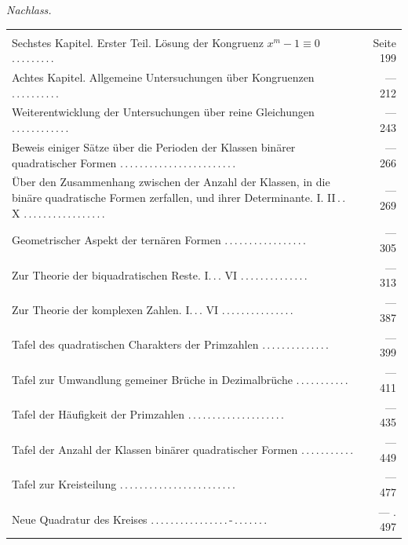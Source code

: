 \par\medskip{}\textit{Nachlass.}
\begingroup\fontsize{10}{13}\selectfont
\begin{longtable}{@{}>{\raggedright\arraybackslash}p{.86\linewidth}@{\quad}r@{}}
\multicolumn{2}{@{}l}{Untersuchung der Reste:}\\[3pt]
Sechstes Kapitel. Erster Teil. Lösung der Kongruenz $x^m-1\equiv0$ .\,.\,.\,.\,.\,.\,.\,.\,. & Seite 199 \\[3pt]
Achtes Kapitel. Allgemeine Untersuchungen über Kongruenzen .\,.\,.\,.\,.\,.\,.\,.\,.\,. & — 212 \\[3pt]
Weiterentwicklung der Untersuchungen über reine Gleichungen .\,.\,.\,.\,.\,.\,.\,.\,.\,.\,.\,. & — 243 \\[3pt]
Beweis einiger Sätze über die Perioden der Klassen binärer quadratischer Formen .\,.\,.\,.\,.\,.\,.\,.\,.\,.\,.\,.\,.\,.\,.\,.\,.\,.\,.\,.\,.\,.\,.\,. & — 266 \\[3pt]
Über den Zusammenhang zwischen der Anzahl der Klassen, in die binäre quadratische Formen zerfallen, und ihrer Determinante. I. II\,.\,. X .\,.\,.\,.\,.\,.\,.\,.\,.\,.\,.\,.\,.\,.\,.\,.\,. & — 269 \\[3pt]
Geometrischer Aspekt der ternären Formen .\,.\,.\,.\,.\,.\,.\,.\,.\,.\,.\,.\,.\,.\,.\,.\,. & — 305 \\[3pt]
Zur Theorie der biquadratischen Reste. I.\,.\,. VI .\,.\,.\,.\,.\,.\,.\,.\,.\,.\,.\,.\,.\,. & — 313 \\[3pt]
Zur Theorie der komplexen Zahlen. I.\,.\,. VI .\,.\,.\,.\,.\,.\,.\,.\,.\,.\,.\,.\,.\,.\,. & — 387 \\[3pt]
Tafel des quadratischen Charakters der Primzahlen .\,.\,.\,.\,.\,.\,.\,.\,.\,.\,.\,.\,.\,. & — 399 \\[3pt]
Tafel zur Umwandlung gemeiner Brüche in Dezimalbrüche .\,.\,.\,.\,.\,.\,.\,.\,.\,.\,. & — 411 \\[3pt]
Tafel der Häufigkeit der Primzahlen .\,.\,.\,.\,.\,.\,.\,.\,.\,.\,.\,.\,.\,.\,.\,.\,.\,.\,.\,. & — 435 \\[3pt]
Tafel der Anzahl der Klassen binärer quadratischer Formen .\,.\,.\,.\,.\,.\,.\,.\,.\,.\,. & — 449 \\[3pt]
Tafel zur Kreisteilung .\,.\,.\,.\,.\,.\,.\,.\,.\,.\,.\,.\,.\,.\,.\,.\,.\,.\,.\,.\,.\,.\,.\,. & — 477 \\[3pt]
Neue Quadratur des Kreises .\,.\,.\,.\,.\,.\,.\,.\,.\,.\,.\,.\,.\,.\,.\,.\,-\,.\,.\,.\,.\,.\,.\,. & — . 497 \\[3pt]

\end{longtable}

